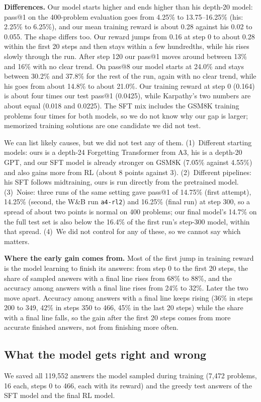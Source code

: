 \documentclass[10pt]{article}
\newcommand{\code}[1]{\texttt{#1}}
\begin{document}
\textbf{Differences.} Our model starts higher and ends higher than his depth-20 model: pass@1 on the 400-problem evaluation goes from 4.25\% to 13.75--16.25\% (his: 2.25\% to 6.25\%), and our mean training reward is about 0.28 against his 0.02 to 0.055. The shape differs too. Our reward jumps from 0.16 at step 0 to about 0.28 within the first 20 steps and then stays within a few hundredths, while his rises slowly through the run. After step 120 our pass@1 moves around between 13\% and 16\% with no clear trend. On pass@8 our model starts at 24.0\% and stays between 30.2\% and 37.8\% for the rest of the run, again with no clear trend, while his goes from about 14.8\% to about 21.0\%. Our training reward at step 0 (0.164) is about four times our test pass@1 (0.0425), while Karpathy's two numbers are about equal (0.018 and 0.0225). The SFT mix includes the GSM8K training problems four times for both models, so we do not know why our gap is larger; memorized training solutions are one candidate we did not test.

We can list likely causes, but we did not test any of them. (1)~Different starting models: ours is a depth-24 Forgetting Transformer from A3, his is a depth-20 GPT, and our SFT model is already stronger on GSM8K (7.05\% against 4.55\%) and also gains more from RL (about 8 points against 3). (2)~Different pipelines: his SFT follows midtraining, ours is run directly from the pretrained model. (3)~Noise: three runs of the same setting gave pass@1 of 14.75\% (first attempt), 14.25\% (second, the W\&B run \code{a4-rl2}) and 16.25\% (final run) at step 300, so a spread of about two points is normal on 400 problems; our final model's 14.7\% on the full test set is also below the 16.4\% of the first run's step-300 model, within that spread. (4)~We did not control for any of these, so we cannot say which matters.

\textbf{Where the early gain comes from.} Most of the first jump in training reward is the model learning to finish its answers: from step 0 to the first 20 steps, the share of sampled answers with a final line rises from 68\% to 88\%, and the accuracy among answers with a final line rises from 24\% to 32\%. Later the two move apart. Accuracy among answers with a final line keeps rising (36\% in steps 200 to 349, 42\% in steps 350 to 466, 45\% in the last 20 steps) while the share with a final line falls, so the gain after the first 20 steps comes from more accurate finished answers, not from finishing more often.

\subsection*{What the model gets right and wrong}
We saved all 119{,}552 answers the model sampled during training (7{,}472 problems, 16 each, steps 0 to 466, each with its reward) and the greedy test answers of the SFT model and the final RL model.
\end{document}
